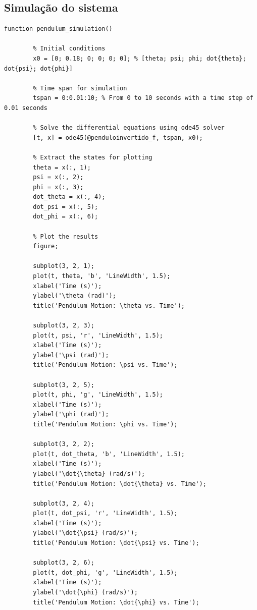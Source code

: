 \documentclass[10pt]{article}
\begin{document}
\begin{appendices}

\section{Simulação do sistema}

\begin{lstlisting}[caption={Código da simulação do sistema com ode45}, label=lst:pendulum_sim]
    function pendulum_simulation()

        % Initial conditions
        x0 = [0; 0.18; 0; 0; 0; 0]; % [theta; psi; phi; dot{theta}; dot{psi}; dot{phi}]

        % Time span for simulation
        tspan = 0:0.01:10; % From 0 to 10 seconds with a time step of 0.01 seconds

        % Solve the differential equations using ode45 solver
        [t, x] = ode45(@penduloinvertido_f, tspan, x0);

        % Extract the states for plotting
        theta = x(:, 1);
        psi = x(:, 2);
        phi = x(:, 3);
        dot_theta = x(:, 4);
        dot_psi = x(:, 5);
        dot_phi = x(:, 6);

        % Plot the results
        figure;

        subplot(3, 2, 1);
        plot(t, theta, 'b', 'LineWidth', 1.5);
        xlabel('Time (s)');
        ylabel('\theta (rad)');
        title('Pendulum Motion: \theta vs. Time');

        subplot(3, 2, 3);
        plot(t, psi, 'r', 'LineWidth', 1.5);
        xlabel('Time (s)');
        ylabel('\psi (rad)');
        title('Pendulum Motion: \psi vs. Time');

        subplot(3, 2, 5);
        plot(t, phi, 'g', 'LineWidth', 1.5);
        xlabel('Time (s)');
        ylabel('\phi (rad)');
        title('Pendulum Motion: \phi vs. Time');

        subplot(3, 2, 2);
        plot(t, dot_theta, 'b', 'LineWidth', 1.5);
        xlabel('Time (s)');
        ylabel('\dot{\theta} (rad/s)');
        title('Pendulum Motion: \dot{\theta} vs. Time');

        subplot(3, 2, 4);
        plot(t, dot_psi, 'r', 'LineWidth', 1.5);
        xlabel('Time (s)');
        ylabel('\dot{\psi} (rad/s)');
        title('Pendulum Motion: \dot{\psi} vs. Time');

        subplot(3, 2, 6);
        plot(t, dot_phi, 'g', 'LineWidth', 1.5);
        xlabel('Time (s)');
        ylabel('\dot{\phi} (rad/s)');
        title('Pendulum Motion: \dot{\phi} vs. Time');


\end{lstlisting}
\end{appendices}
\end{document}
